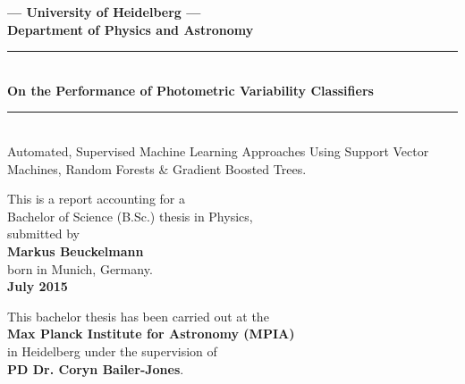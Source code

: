 \begin{titlepage}
\begin{center}

\Large\textbf{--- University of Heidelberg ---\\Department of Physics and Astronomy}

\vspace*{1.5cm}

\rule{\linewidth}{0.8pt}\\
\vspace{.3cm}
\Huge\textbf{On the Performance of Photometric Variability Classifiers}
\rule{\linewidth}{0.8pt}\\
\vspace{0.8cm}
\large{Automated, Supervised Machine Learning Approaches Using Support Vector Machines, Random Forests \& Gradient Boosted Trees.}

\vspace{4cm}

\normalsize
This is a report accounting for a\\
Bachelor of Science (B.Sc.) thesis in Physics,\\
submitted by\\
\vspace{0.2cm}
\Large\textbf{Markus Beuckelmann}\\
\normalsize
\vspace{0.2cm}
born in Munich, Germany.\\
\vspace{0.5cm}
\Large\textbf{July 2015}
\normalsize

\vspace*{2.5cm}

\normalsize
This bachelor thesis has been carried out at the\\
\textbf{Max Planck Institute for Astronomy (MPIA)}\\ in Heidelberg
under the supervision of\\
\textbf{PD Dr. Coryn Bailer-Jones}.

\end{center}

\end{titlepage}
